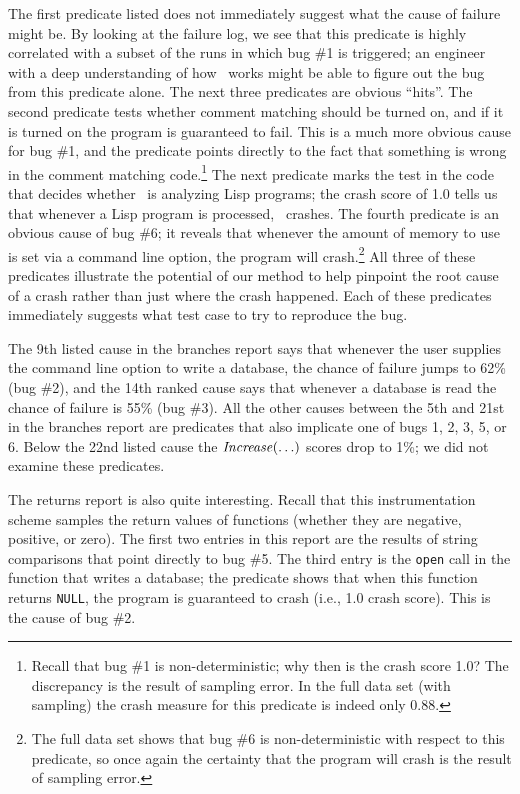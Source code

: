 The first predicate listed does not immediately suggest what the cause
of failure might be. By looking at the failure log, we see that this predicate
is highly correlated with a subset of the runs in which bug \#1 is
triggered; an engineer with a deep understanding of how \moss\ works
might be able to figure out the bug from this predicate alone.
The next three predicates are obvious ``hits''. The second predicate
tests whether comment matching should be turned on, and if it is turned on the program is
guaranteed to fail. This is a much more obvious cause for bug \#1, and the predicate points directly
to the fact that something is wrong in the comment matching
code.\footnote{Recall that bug \#1 is non-deterministic; why then is
  the crash score 1.0?
The discrepancy is the result of sampling error.  In the full data set
(with  sampling) the crash measure for this predicate is indeed
only 0.88.}
The
next predicate marks the test in the code that decides whether \moss\ is analyzing Lisp
programs; the crash score of 1.0 tells us that whenever a Lisp program is
processed, \moss\ crashes.  The fourth predicate
is an obvious cause of
bug \#6; it reveals that whenever the amount of memory to use is set
via a command line option, the program will crash.\footnote{The full data set shows that bug \#6 is non-deterministic with respect to this predicate, so once again the certainty that the program will crash is the result of sampling error.}  All three of these predicates illustrate the potential of our method to
help pinpoint the root cause of a crash rather than just where the crash
happened.  Each of these predicates immediately suggests
what test case to try to reproduce the bug.

The 9th listed cause in the branches report says that whenever the
user supplies the command line option to write a database, the chance
of failure jumps to 62\% (bug \#2), and the 14th ranked cause says
that whenever a database is read the chance of failure is 55\% (bug
\#3).  All the other causes between the 5th and 21st in the branches
report are predicates that also implicate one of bugs 1, 2, 3, 5, or
6.  Below the 22nd listed cause the $\mbox{\textit{Increase}}(\ldots)$ scores drop to
1\%; we did not examine these predicates.

The returns report is also quite interesting.  Recall that this
instrumentation scheme samples the return values of functions (whether
they are negative, positive, or zero).  The first two entries in this
report are the results of string comparisons that point directly to bug
\#5.  The third entry is the {\tt open} call in the function that writes
a database; the predicate shows that when this function returns {\tt NULL},
the program is guaranteed to crash (i.e., 1.0 crash score).  This is the
cause of bug \#2.

